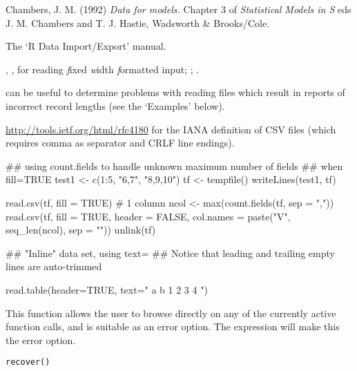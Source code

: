 %
\begin{References}\relax
Chambers, J. M. (1992)
\emph{Data for models.}
Chapter 3 of \emph{Statistical Models in S}
eds J. M. Chambers and T. J. Hastie, Wadsworth \& Brooks/Cole.
\end{References}
%
\begin{SeeAlso}\relax
The `R Data Import/Export' manual.

, ,
 for reading \emph{f}ixed \emph{w}idth
\emph{f}ormatted input;
;
.

 can be useful to determine problems with
reading files which result in reports of incorrect record lengths (see
the `Examples' below).

\url{http://tools.ietf.org/html/rfc4180} for the IANA definition of
CSV files (which requires comma as separator and CRLF line endings).
\end{SeeAlso}
%
\begin{Examples}
\begin{ExampleCode}
## using count.fields to handle unknown maximum number of fields
## when fill=TRUE
test1 <- c(1:5, "6,7", "8,9,10")
tf <- tempfile()
writeLines(test1, tf)

read.csv(tf, fill = TRUE) # 1 column
ncol <- max(count.fields(tf, sep = ","))
read.csv(tf, fill = TRUE, header = FALSE,
         col.names = paste("V", seq_len(ncol), sep = ""))
unlink(tf)

## "Inline" data set, using text=
## Notice that leading and trailing empty lines are auto-trimmed

read.table(header=TRUE, text="
a b
1 2
3 4
")
\end{ExampleCode}
\end{Examples}
%
\begin{Description}\relax
This function allows the user to browse directly on any of the
currently active function calls, and is suitable as an error option.
The expression  will make this
the error option.
\end{Description}
%
\begin{Usage}
\begin{verbatim}
recover()
\end{verbatim}
\end{Usage}
